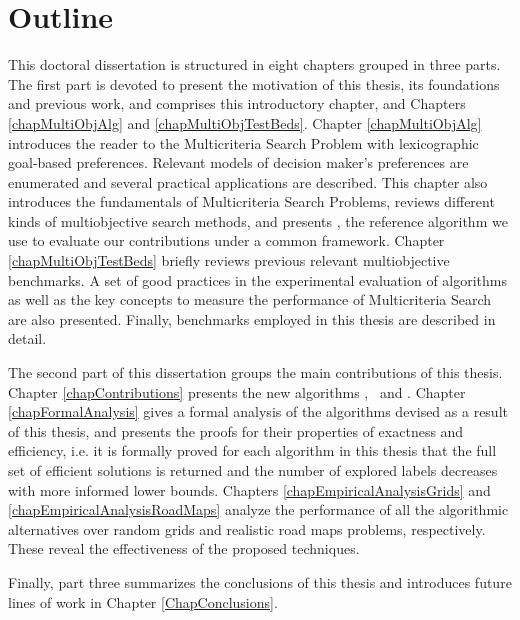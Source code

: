 \section{Outline}
\label{ChapIntroduction:sec:outline}

This doctoral dissertation is structured in eight chapters grouped in three parts. The first part is devoted to present the motivation of this thesis, its foundations and previous work, and comprises this introductory chapter, and Chapters \ref{chapMultiObjAlg} and \ref{chapMultiObjTestBeds}. Chapter \ref{chapMultiObjAlg} introduces the reader to the Multicriteria Search Problem with lexicographic goal-based preferences. Relevant models of decision maker's preferences are enumerated and several practical applications are described. This chapter also introduces the fundamentals of Multicriteria Search Problems, reviews different kinds of multiobjective search methods, and presents \namoa, the reference algorithm we use to evaluate our contributions under a common framework. Chapter \ref{chapMultiObjTestBeds} briefly reviews previous relevant multiobjective benchmarks. A set of good practices in the experimental evaluation of algorithms as well as the key concepts to measure the performance of Multicriteria Search are also presented. Finally, benchmarks employed in this thesis are described in detail. 

The second part of this dissertation groups the main contributions of this thesis. Chapter \ref{chapContributions} presents 
the new algorithms \lexgo, \namoate \ and \lexgote. Chapter \ref{chapFormalAnalysis} gives a formal analysis of the algorithms devised as a result of this thesis, and presents the proofs for their properties of exactness and efficiency, i.e. it is formally proved for each algorithm in this thesis that the full set of efficient solutions is returned and the number of explored labels decreases with more informed lower bounds. Chapters \ref{chapEmpiricalAnalysisGrids} and \ref{chapEmpiricalAnalysisRoadMaps} analyze the performance of all the algorithmic alternatives over random grids and realistic road maps problems, respectively. These reveal the effectiveness of the proposed techniques.

Finally, part three summarizes the conclusions of this thesis and introduces future lines of work in Chapter \ref{ChapConclusions}.
